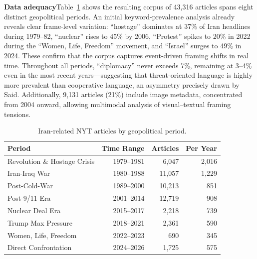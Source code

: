 \documentclass{dhnbpub}
\begin{document}
\textbf{Data adequacy}\quad Table~\ref{tab:periods} shows the resulting corpus of 43,316 articles spans eight distinct geopolitical periods. An initial keyword-prevalence analysis already reveals clear frame-level variation: ``hostage'' dominates at 37\% of Iran headlines during 1979--82, ``nuclear'' rises to 45\% by 2006, ``Protest'' spikes to 20\% in 2022 during the ``Women, Life, Freedom'' movement, and ``Israel'' surges to 49\% in 2024. These confirm that the corpus captures event-driven framing shifts in real time. Throughout all periods, ``diplomacy'' never exceeds 7\%, remaining at 3--4\% even in the most recent years---suggesting that threat-oriented language is highly more prevalent than cooperative language, an asymmetry precisely drawn by Said. Additionally, 9,131 articles (21\%) include image metadata, concentrated from 2004 onward, allowing multimodal analysis of visual--textual framing tensions.



\begin{table}[!t]
  \caption{Iran-related NYT articles by geopolitical period.}
  \label{tab:periods}
  \begin{tabular}{lrrr}
    \toprule
    Period & Time Range & Articles & Per Year \\
    \midrule
    Revolution \& Hostage Crisis & 1979--1981 & 6,047 & 2,016 \\
    Iran-Iraq War & 1980--1988 & 11,057 & 1,229 \\
    Post-Cold-War & 1989--2000 & 10,213 & 851 \\
    Post-9/11 Era & 2001--2014 & 12,719 & 908 \\
    Nuclear Deal Era & 2015--2017 & 2,218 & 739 \\
    Trump Max Pressure & 2018--2021 & 2,361 & 590 \\
    Women, Life, Freedom & 2022--2023 & 690 & 345 \\
    Direct Confrontation & 2024--2026 & 1,725 & 575 \\
    \bottomrule
  \end{tabular}
\end{table}

\end{document}
